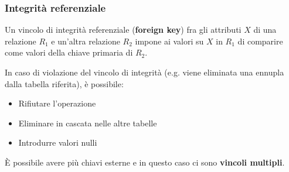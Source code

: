\subsubsection{Integrità referenziale}
\begin{definition}
	Un vincolo di integrità referenziale (\textbf{foreign key}) fra gli attributi $X$ di una relazione $R_1$ e un’altra relazione $R_2$ impone ai valori su $X$ in $R_1$ di comparire come valori della chiave primaria di $R_2$.
\end{definition}
In caso di violazione del vincolo di integrità (e.g. viene eliminata una ennupla dalla tabella riferita), è possibile:
\begin{itemize}
	\item Rifiutare l'operazione
	\item Eliminare in cascata nelle altre tabelle
	\item Introdurre valori nulli
\end{itemize}

\begin{note}
	È possibile avere più chiavi esterne e in questo caso ci sono \textbf{vincoli multipli}.
\end{note}